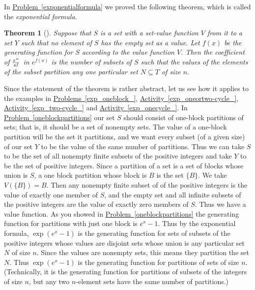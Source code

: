 \documentclass[10pt,]{book}
\theoremstyle{plain}
\newtheorem{theorem}{Theorem}[section]
\theoremstyle{definition}
\numberwithin{equation}{chapter}
\begin{document}
In \hyperref[exponentialformula]{Problem~\ref{exponentialformula}} we proved the following theorem, which is called the \emph{exponential formula}.%
\begin{theorem}[{}]\label{theorem-4}
Suppose that \(S\) is a set with a set-value function \(V\) from it to a set \(Y\) such that no element of \(S\) has the empty set as a value. Let \(f(x)\) be the generating function for \(S\) according to the value function \(V\). Then the coefficient of \(x^n\over n!\) in \(e^{f(x)}\) is the number of subsets of \(S\) such that the values of the elements of the subset partition any one particular set \(N\subseteq T\) of size \(n\).%
\end{theorem}
Since the statement of the theorem is rather abstract, let us see how it applies to the examples in \hyperref[exp_oneblock_]{Problems~\ref{exp_oneblock_}}, \hyperref[exp_oneortwo-cycle_]{Activity~\ref{exp_oneortwo-cycle_}}, \hyperref[exp_two-cycle_]{Activity~\ref{exp_two-cycle_}} and \hyperref[exp_onecycle_]{Activity~\ref{exp_onecycle_}}. In \hyperref[oneblockpartitions]{Problem~\ref{oneblockpartitions}} our set \(S\) should consist of one-block partitions of sets; that is, it should be a set of nonempty sets. The value of a one-block partition will be the set it partitions, and we want every subset (of a given size) of our set \(Y\) to be the value of the same number of partitions. Thus we can take \(S\) to be the set of all nonempty finite subsets of the positive integers and take \(Y\) to be the set of positive integers. Since a partition of a set is a set of blocks whose union is \(S\), a one block partition whose block is \(B\) is the set \(\{B\}\). We take \(V(\{B\}) =B\). Then any nonempty finite subset of of the positive integers is the value of exactly one member of \(S\), and the empty set and all infinite subsets of the positive integers are the value of exactly zero members of \(S\). Thus we have a value function. As you showed in \hyperref[oneblockpartitions]{Problem~\ref{oneblockpartitions}} the generating function for partitions with just one block is \(e^x-1\). Thus by the exponential formula, \(\exp(e^x-1)\) is the generating function for sets of subsets of the positive integers whose values are disjoint sets whose union is any particular set \(N\) of size \(n\). Since the values are nonempty sets, this means they partition the set \(N\). Thus \(\exp(e^x-1)\) is the generating function for partitions of sets of size \(n\). (Technically, it is the generating function for partitions of subsets of the integers of size \(n\), but any two \(n\)-element sets have the same number of partitions.)%
\end{document}
